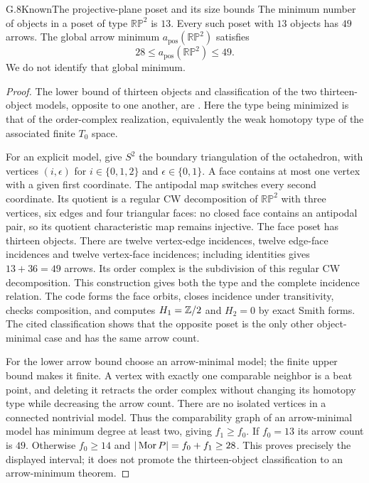 \begin{claim}{G.8}{Known}{The projective-plane poset and its size bounds}
The minimum number of objects in a poset of type $\mathbb{RP}^2$ is $13$. Every such poset with $13$ objects has $49$ arrows. The global arrow minimum $a_{\mathrm{pos}}(\mathbb{RP}^2)$ satisfies
\[
                        28\leq a_{\mathrm{pos}}(\mathbb{RP}^2)\leq49.
\]
We do not identify that global minimum.
\end{claim}
\begin{proof}
The lower bound of thirteen objects and classification of the two thirteen-object models, opposite to one another, are \citet[Corollary 5.8 and Theorem 5.10, arXiv version~1]{CianciOttina2015}. Here the type being minimized is that of the order-complex realization, equivalently the weak homotopy type of the associated finite $T_0$ space.

For an explicit model, give $S^2$ the boundary triangulation of the octahedron, with vertices $(i,\epsilon)$ for $i\in\{0,1,2\}$ and $\epsilon\in\{0,1\}$. A face contains at most one vertex with a given first coordinate. The antipodal map switches every second coordinate. Its quotient is a regular CW decomposition of $\mathbb{RP}^2$ with three vertices, six edges and four triangular faces: no closed face contains an antipodal pair, so its quotient characteristic map remains injective. The face poset has thirteen objects. There are twelve vertex-edge incidences, twelve edge-face incidences and twelve vertex-face incidences; including identities gives $13+36=49$ arrows. Its order complex is the subdivision of this regular CW decomposition. This construction gives both the type and the complete incidence relation. The code forms the face orbits, closes incidence under transitivity, checks composition, and computes $H_1=\mathbb Z/2$ and $H_2=0$ by exact Smith forms. The cited classification shows that the opposite poset is the only other object-minimal case and has the same arrow count.

For the lower arrow bound choose an arrow-minimal model; the finite upper bound makes it finite. A vertex with exactly one comparable neighbor is a beat point, and deleting it retracts the order complex without changing its homotopy type while decreasing the arrow count. There are no isolated vertices in a connected nontrivial model. Thus the comparability graph of an arrow-minimal model has minimum degree at least two, giving $f_1\geq f_0$. If $f_0=13$ its arrow count is $49$. Otherwise $f_0\geq14$ and $|\operatorname{Mor} P|=f_0+f_1\geq28$. This proves precisely the displayed interval; it does not promote the thirteen-object classification to an arrow-minimum theorem.
\end{proof}

